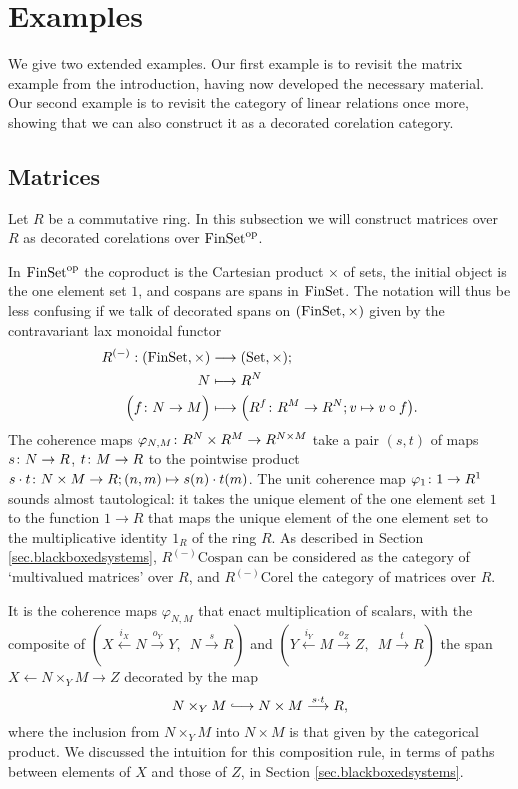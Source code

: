 \section{Examples} \label{sec:excor}
We give two extended examples. Our first example is to revisit the matrix
example from the introduction, having now developed the necessary material. Our
second example is to revisit the category of linear relations once more, showing
that we can also construct it as a decorated corelation category. 

\subsection{Matrices} \label{ssec.matrices}

Let $R$ be a commutative ring. In this subsection we will construct matrices
over $R$ as decorated corelations over $\mathrm{FinSet}^{\mathrm{op}}$. 

In $\mathrm{FinSet}^{\mathrm{op}}$ the coproduct is the Cartesian product $\times$ of sets, the
initial object is the one element set $1$, and cospans are spans in $\mathrm{FinSet}$.
The notation will thus be less confusing if we talk of decorated spans on
$(\mathrm{FinSet},\times)$ given by the contravariant lax monoidal functor
\begin{align*}
  R^{(-)}: (\mathrm{FinSet},\times) &\longrightarrow (\mathrm{Set},\times); \\
  N &\longmapsto R^N \\
  \Big(f{\colon} N \to M\Big) &\longmapsto \Big(R^f{\colon} R^M \to R^N; v \mapsto v \circ
  f\big).
\end{align*}
The coherence maps $\varphi_{N,M}{\colon} R^N \times R^M \to R^{N\times M}$ take a
pair $(s,t)$ of maps $s{\colon} N \to R$, $t{\colon} M \to R$ to the pointwise product
$s\cdot t {\colon} N\times M \to R; (n,m) \mapsto s(n) \cdot t(m)$. The unit
coherence map $\varphi_1{\colon} 1 \to R^1$ sounds almost tautological: it takes
the unique element of the one element set $1$ to the function $1 \to R$ that
maps the unique element of the one element set to the multiplicative identity
$1_R$ of the ring $R$.  As described in Section \ref{sec.blackboxedsystems},
$R^{(-)}\mathrm{Cospan}$ can be considered as the category of `multivalued
matrices' over $R$, and $R^{(-)}\mathrm{Corel}$ the category of matrices over
$R$.

It is the coherence maps $\varphi_{N,M}$ that enact multiplication of scalars,
with the composite of $(X \xleftarrow{i_X} N \xrightarrow{o_Y} Y,\enspace N
\xrightarrow{s} R)$ and $(Y \xleftarrow{i_Y} M \xrightarrow{o_Z} Z,\enspace M
\xrightarrow{t} R)$ the span $X \leftarrow N\times_YM \rightarrow Z$ decorated
by the map
\[
  N \times_YM \hooklongrightarrow N \times M \stackrel{s \cdot t}\longrightarrow
  R,
\]
where the inclusion from $N \times_YM$ into $N \times M$ is that given by the
categorical product. We discussed the intuition for this composition rule, in
terms of paths between elements of $X$ and those of $Z$, in Section
\ref{sec.blackboxedsystems}. 


